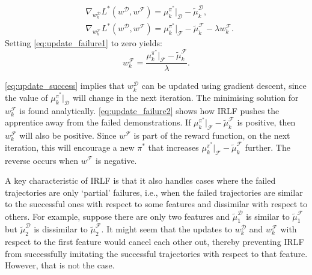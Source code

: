 \documentclass[a4paper,11pt]{report}
\begin{document}
\begin{align}
	&\nabla_{w^{\mathcal{D}}_k}L^*(w^{\mathcal{D}},w^{\mathcal{F}}) = \mu^{\pi^*}_ k|_{\mathcal{D}}- \widetilde{\mu}^{\mathcal{D}}_k \label{eq:update_success},\\
		&\nabla_{w^{\mathcal{F}}_k}L^*(w^{\mathcal{D}},w^{\mathcal{F}}) = \mu^{\pi^*}_k|_{\mathcal{F}} - \widetilde{\mu}^{\mathcal{F}}_k - \lambda w^{\mathcal{F}}_k. \label{eq:update_failure1}
\end{align}
Setting \eqref{eq:update_failure1} to zero yields:
\begin{equation}
  \label{eq:update_failure2}
  w^{\mathcal{F}}_k = \frac{\mu^{\pi^*}_k|_{\mathcal{F}} - \widetilde{\mu}^{\mathcal{F}}_k}{\lambda}.
\end{equation}
%

\noindent \eqref{eq:update_success} implies that $w^{\mathcal{D}}_k$ can be updated using gradient descent, since the value of $\mu^{\pi^*}_ k|_{\mathcal{D}}$ will change in the next iteration.
The minimising solution for $w^{\mathcal{F}}_k$ is found analytically.
\eqref{eq:update_failure2} shows how IRLF pushes the apprentice away from the failed demonstrations.  If $\mu^{\pi^*}_k|_{\mathcal{F}} - \widetilde{\mu}^{\mathcal{F}}_k$ is positive, then $w^{\mathcal{F}}_k$ will also be positive.  Since $w^{\mathcal{F}}$ is part of the reward function, on the next iteration, this will encourage a new $\pi^*$ that increases $\mu^{\pi^*}_k|_{\mathcal{F}} - \widetilde{\mu}^{\mathcal{F}}_k$ further.  The reverse occurs when $w^{\mathcal{F}}$ is negative.

A key characteristic of IRLF is that it also handles cases where the failed trajectories are only `partial' failures, i.e., when the failed trajectories are similar to the successful ones with respect to some features and dissimilar with respect to others.
%
%
For example, suppose there are only two features and $\widetilde{\mu}^{\mathcal{D}}_1$ is similar to $\widetilde{\mu}^{\mathcal{F}}_1$ but $\widetilde{\mu}^{\mathcal{D}}_2$ is dissimilar to $\widetilde{\mu}^{\mathcal{F}}_2$. %
It might seem that the updates to $w^{\mathcal{D}}_k$ and $w^{\mathcal{F}}_k$ with respect to the first feature would cancel each other out, thereby preventing IRLF from successfully imitating the successful trajectories with respect to that feature.  However, that is not the case. 
\end{document}
